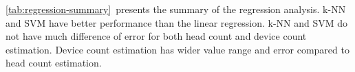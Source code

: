 \autoref{tab:regression-summary}~presents the summary of the regression analysis. \ac{k-NN} and \ac{SVM} have better performance than the linear regression. \ac{k-NN} and \ac{SVM} do not have much difference of error for both head count and device count estimation. Device count estimation has wider value range and error compared to head count estimation.


